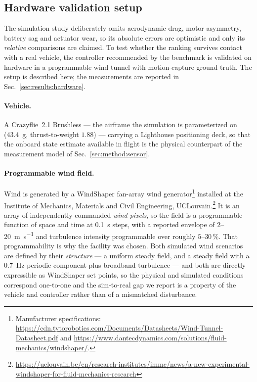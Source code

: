 \subsection{Hardware validation setup}
\label{sec:method:hardware}

The simulation study deliberately omits aerodynamic drag, motor asymmetry, battery sag
and actuator wear, so its absolute errors are optimistic and only its \emph{relative}
comparisons are claimed. To test whether the ranking survives contact with a real
vehicle, the controller recommended by the benchmark is validated on hardware in a
programmable wind tunnel with motion-capture ground truth. The setup is described here;
the measurements are reported in Sec.~\ref{sec:results:hardware}.

\paragraph{Vehicle.}
A Crazyflie~2.1 Brushless --- the airframe the simulation is parameterized on
(\SI{43.4}{\gram}, thrust-to-weight $1.88$) --- carrying a Lighthouse positioning deck,
so that the onboard state estimate available in flight is the physical counterpart of
the measurement model of Sec.~\ref{sec:method:sensor}.

\paragraph{Programmable wind field.}
Wind is generated by a WindShaper fan-array wind
generator\footnote{Manufacturer specifications: \url{https://cdn.tytorobotics.com/Documents/Datasheets/Wind-Tunnel-Datasheet.pdf} and \url{https://www.dantecdynamics.com/solutions/fluid-mechanics/windshaper/}.} installed at the Institute of
Mechanics, Materials and Civil Engineering, UCLouvain.\footnote{\url{https://uclouvain.be/en/research-institutes/immc/news/a-new-experimental-windshaper-for-fluid-mechanics-research}}
It is an array of independently commanded \emph{wind pixels}, so the field is a
programmable function of space and time at \SI{0.1}{\second} steps, with a reported
envelope of $2$--\SI{20}{\meter\per\second} and turbulence intensity programmable over
roughly $5$--$30\,\%$.
That programmability is why the facility was chosen. Both simulated wind scenarios are
defined by their \emph{structure} --- a uniform steady field, and a steady field with a
\SI{0.7}{\hertz} periodic component plus broadband turbulence --- and both are directly
expressible as WindShaper set points, so the physical and simulated conditions
correspond one-to-one and the sim-to-real gap we report is a property of the vehicle and
controller rather than of a mismatched disturbance.

